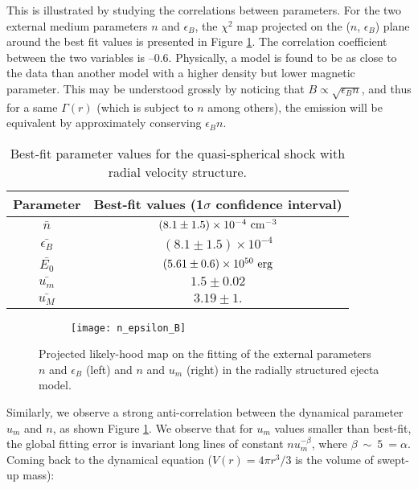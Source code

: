This is illustrated by studying the correlations between parameters. For the two external medium parameters $n$ and $\epsilon_B$, the $\chi^2$ map projected on the ($n$, $\epsilon_B$) plane around the best fit values is presented in Figure \ref{n_epsilon_B}. The correlation coefficient between the two variables is --0.6. Physically, a model is found to be as close to the data than another  model with a higher density but lower magnetic parameter. This may be understood grossly by noticing that $B \propto \sqrt{\epsilon_B n}$, and thus for a same $\Gamma(r)$ (which is subject to $n$ among others), the emission will be equivalent by approximately conserving $\epsilon_B n$.

\begin{table}
\begin{center}
\begin{tabular}{c|c}
\bf{Parameter} & \bf{Best-fit values (1$\sigma$ confidence interval)}\\
\hline
$\bar{n}$ & $(8.1\pm1.5) \times 10^{-4}~\rm{cm}^{-3}$ \\
$\bar{\epsilon_B}$ & $(8.1\pm1.5) \times 10^{-4} $ \\
$\bar{E_0}$ & $(5.61\pm0.6) \times 10^{50}~\rm{erg}$ \\
$\bar{u_m}$ & $1.5\pm0.02$ \\
$\bar{u_M}$ & $3.19\pm1.$ \\
\end{tabular}
\end{center}
\caption{Best-fit parameter values for the quasi-spherical shock with radial velocity structure.}
\label{cocoon}
\end{table}

\begin{figure}
\centering
\begin{subfigure}
    \centering
    \texttt{[image: n\_epsilon\_B]}
\end{subfigure}%
\begin{subfigure}
    \texttt{[image: umn]}
\end{subfigure}
\caption[Projected likely-hood map on the fitting of the external parameters $n$ and $\epsilon_B$]{Projected likely-hood map on the fitting of the external parameters $n$ and $\epsilon_B$ (left) and $n$ and $u_m$ (right) in the radially structured ejecta model.}
\label{n_epsilon_B}
\end{figure}


Similarly, we observe a strong anti-correlation between the dynamical parameter $u_m$ and $n$, as shown Figure \ref{n_epsilon_B}. We observe that for $u_m$ values smaller than best-fit, the global fitting error is invariant long lines of constant $nu_m^{-\beta}$, where $\beta~\sim~5~=\alpha$. Coming back to the dynamical equation ($V(r) = 4\pi r^3/3$ is the volume of swept-up mass):


